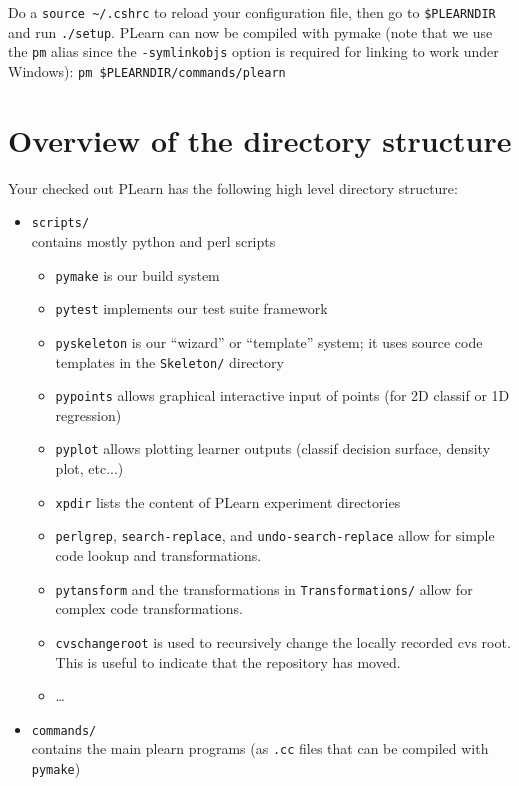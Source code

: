 \documentclass[11pt]{book}
\begin{document}
Do a \verb!source ~/.cshrc! to reload your configuration file, then go
to \verb!$PLEARNDIR! and run \verb!./setup!. PLearn can now be compiled
with pymake (note that we use the \verb!pm! alias since the \verb!-symlinkobjs!
option is required for linking to work under Windows):
\verb!pm $PLEARNDIR/commands/plearn!



\chapter{Overview of the directory structure}

Your checked out PLearn has the following high level directory structure:

\begin{itemize}
\item \verb!scripts/! \\
contains mostly python and perl scripts
  \begin{itemize}
  \item {\tt pymake} is our build system 
  \item {\tt pytest} implements our test suite framework
  \item {\tt pyskeleton} is our ``wizard'' or ``template'' system;  it uses source code templates in the {\tt Skeleton/} directory
  \item {\tt pypoints} allows graphical interactive input of points (for 2D classif or 1D regression)
  \item {\tt pyplot} allows plotting learner outputs (classif decision surface, density plot, etc...) 
  \item {\tt xpdir} lists the content of PLearn experiment directories
  \item {\tt perlgrep}, {\tt search-replace}, and {\tt undo-search-replace} allow for simple code lookup and transformations.
  \item {\tt pytansform} and the transformations in {\tt Transformations/} allow for complex code transformations.
  \item {\tt cvschangeroot} is used to recursively change the locally recorded cvs root. This is useful to indicate that the repository has moved.
  \item \ldots
  \end{itemize}
\item \verb!commands/! \\ 
contains the main plearn programs (as {\tt .cc} files that can be compiled with {\tt pymake})
  \begin{itemize}

\end{itemize}
\end{itemize}
\end{document}
